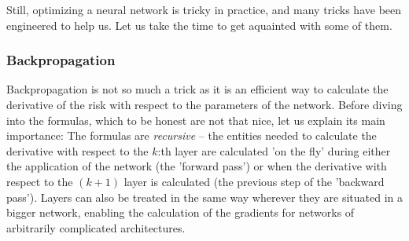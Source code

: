 \documentclass{article}
\begin{document}
Still, optimizing a neural network is tricky in practice, and many tricks have been engineered to help us. Let us take the time to get aquainted with some of them.

\subsubsection{Backpropagation}
Backpropagation is not so much a trick as it is an efficient way to calculate the derivative of the risk with respect to the parameters of the network. Before diving into the formulas, which to be honest are not that nice, let us explain its main importance: The formulas are \emph{recursive} -- the entities needed to calculate the derivative with respect to the $k$:th layer are calculated 'on the fly' during either the application of the network (the 'forward pass') or when the derivative with respect to the $(k+1)$ layer is calculated (the previous step of the 'backward pass'). Layers can also be treated in the same way wherever they are situated in a bigger network, enabling the calculation of the gradients for networks of arbitrarily complicated architectures.
\end{document}
